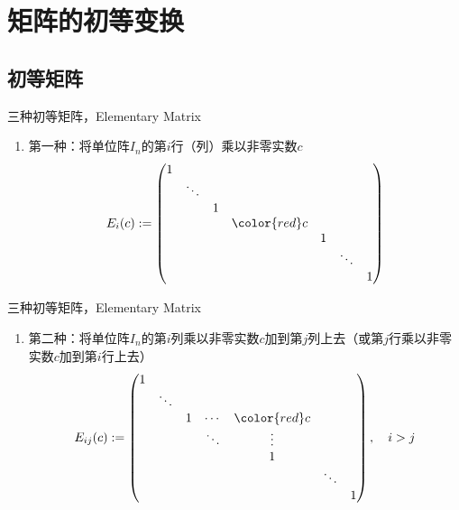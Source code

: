 
\section{矩阵的初等变换}


\subsection{初等矩阵}


\begin{frame}

\begin{block}{三种初等矩阵，Elementary Matrix}
\begin{enumerate}
\item 第一种：将单位阵$I_n$的第$i$行（列）乘以非零实数$c$
\[
E_i(c) := \begin{pmatrix} 1 & & & & & & \\ & \ddots & & & & & \\ & & 1 & & & & \\ & & & {\color{red}c} & & & \\ & & & & 1 & &  \\ & & & & & \ddots & \\ & & & & & & 1 \end{pmatrix}
\]
\end{enumerate}
\end{block}

\end{frame}


\begin{frame}

\begin{block}{三种初等矩阵，Elementary Matrix}
\begin{enumerate}
\addtocounter{enumi}{1}
\item 第二种：将单位阵$I_n$的第$i$列乘以非零实数$c$加到第$j$列上去（或第$j$行乘以非零实数$c$加到第$i$行上去）
\[
E_{ij}(c) := \begin{pmatrix} 1 & & & & & & \\ & \ddots & & & & & \\ & & 1 & \cdots & {\color{red}c} & & \\ & & & \ddots & \vdots & & \\ & & & & 1 & & \\ & & & & & \ddots & \\ & & & & & & 1 \end{pmatrix}, \quad i > j
\]
\end{enumerate}
\end{block}

\end{frame}


